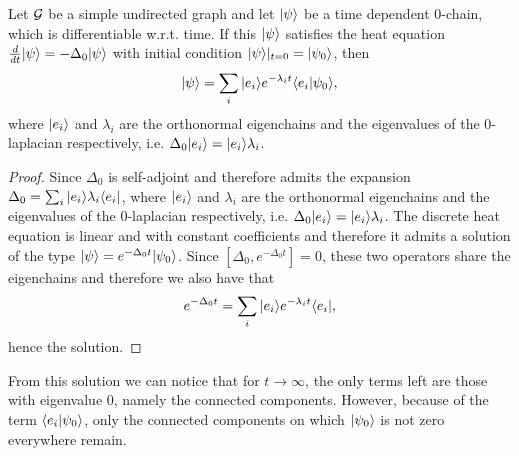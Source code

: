 \documentclass[../2.tex]{subfiles}
\begin{document}
    \begin{prop}
        Let $\mathcal{G}$ be a simple undirected graph and let $| \psi \rangle$ be a time dependent $0$-chain, which is differentiable w.r.t. time.
        If this $| \psi \rangle$ satisfies the heat equation $\frac{d}{dt}| \psi \rangle = -\Delta_0 | \psi \rangle$ with initial condition $| \psi \rangle|_{t = 0} = | \psi_0 \rangle$, then
        \[ | \psi \rangle = \sum_i| e_i \rangle e^{-\lambda_i t}\langle e_i | \psi_0 \rangle, \]
        where $| e_i \rangle$ and $\lambda_i$ are the orthonormal eigenchains and the eigenvalues of the $0$-laplacian respectively,
        i.e. $\Delta_0| e_i \rangle =| e_i \rangle\lambda_i$.
    \end{prop}
    \begin{proof}
        Since $\Delta_0$ is self-adjoint and therefore admits the expansion $\Delta_0 = \sum_i | e_i \rangle\lambda_i\langle e_i |$,
        where $| e_i \rangle$ and $\lambda_i$ are the orthonormal eigenchains and the eigenvalues of the $0$-laplacian respectively,
        i.e. $\Delta_0| e_i \rangle =| e_i \rangle\lambda_i$. The discrete heat equation is linear and with constant coefficients and therefore
        it admits a solution of the type $| \psi \rangle = e^{-\Delta_0 t}| \psi_0 \rangle$.
        Since $[\Delta_0, e^{-\Delta_0 t}] = 0$, these two operators share the eigenchains and therefore we also have that
        \[ e^{-\Delta_0 t} = \sum_i | e_i \rangle e^{-\lambda_i t} \langle e_i |,\]
        hence the solution. \qedhere
    \end{proof}

    From this solution we can notice that for $t \to \infty$, the only terms left are those with eigenvalue $0$, namely the connected components.
    However, because of the term $\langle e_i | \psi_0 \rangle$, only the connected components on which $| \psi_0 \rangle$ is not zero everywhere remain.
\end{document}
